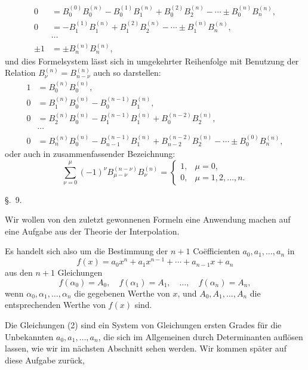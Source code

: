 
\begin{equation}
\begin{aligned}
0&=B_0^{(0)}B_0^{(n)}-B_0^{(1)}B_1^{(n)}+B_0^{(2)}B_2^{(n)}-\cdots\pm B_0^{(n)}B_n^{(n)},\\
0&=-B_1^{(1)}B_1^{(n)}+B_1^{(2)}B_2^{(n)}-\cdots\pm B_1^{(n)}B_n^{(n)},\\
&\cdots\\
\pm 1&=\pm B_n^{(n)}B_n^{(n)},
\end{aligned}
\tag{6}
\end{equation}
und dies Formelsystem lässt sich in umgekehrter Reihenfolge mit Benutzung der Relation $B_\nu^{(n)}=B_{n-\nu}^{(n)}$ auch so darstellen:
\begin{equation}
\begin{aligned}
1&=B_0^{(n)}B_0^{(n)},\\
0&=B_1^{(n)}B_0^{(n)}-B_0^{(n-1)}B_1^{(n)},\\
0&=B_2^{(n)}B_0^{(n)}-B_1^{(n-1)}B_1^{(n)}+B_0^{(n-2)}B_2^{(n)},\\
&\cdots\\
0&=B_n^{(n)}B_0^{(n)}-B_{n-1}^{(n-1)}B_1^{(n)}+B_{n-2}^{(n-2)}B_2^{(n)}-\cdots\pm B_0^{(0)}B_n^{(n)},
\end{aligned}
\tag{7}
\end{equation}
oder auch in zusammenfassender Bezeichnung:
\begin{equation}
 \sum_{\nu=0}^{\mu}(-1)^\nu B_{\mu-\nu}^{(n-\nu)}B_\nu^{(n)}
 =\begin{cases}
 1,&\mu=0,\\
 0,&\mu=1,2,\ldots,n.
 \end{cases}
\tag{8}
\end{equation}


\begin{center}
{\large \S.\ 9.}

\vspace{0.5em}
{\large{}}
\end{center}

Wir wollen von den zuletzt gewonnenen Formeln eine Anwendung machen auf eine Aufgabe aus der Theorie der Interpolation.


Es handelt sich also um die Bestimmung der $n+1$ Coëfficienten $a_0,a_1,\ldots,a_n$ in
\begin{equation}
 f(x)=a_0x^n+a_1x^{n-1}+\cdots+a_{n-1}x+a_n
\tag{1}
\end{equation}
aus den $n+1$ Gleichungen
\begin{equation}
 f(\alpha_0)=A_0,\quad f(\alpha_1)=A_1,\quad \ldots,\quad f(\alpha_n)=A_n,
\tag{2}
\end{equation}
wenn $\alpha_0,\alpha_1,\ldots,\alpha_n$ die gegebenen Werthe von $x$, und $A_0,A_1,\ldots,A_n$ die entsprechenden Werthe von $f(x)$ sind.

Die Gleichungen (2) sind ein System von Gleichungen ersten Grades für die Unbekannten $a_0,a_1,\ldots,a_n$, die sich im Allgemeinen durch Determinanten auflösen lassen, wie wir im nächsten Abschnitt sehen werden. Wir kommen später auf diese Aufgabe zurück,

